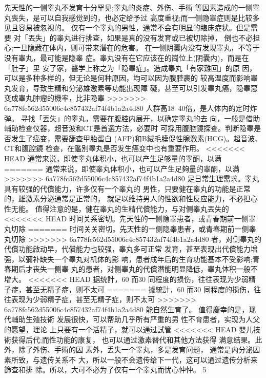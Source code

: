 \documentclass[12pt,UTF8]{ctexbook}
\begin{document}
先天性的一侧睾丸不发育十分罕见;睾丸的炎症、外伤、手術
等因素造成的一侧睾丸喪失，是可以自我感觉到的，也必定给予过
高度重视;而一侧隐睾症则是比较多见且容易被忽视的。
仅有一个睾丸的男性，通常不会有明显的臨床症状。但是需要
对「丟失」的睾丸进行排查，如果是真的没有发育或已被切除掉，
倒也不必担心;一旦隐藏在体内，则可带来潛在的危害。
在一侧阴囊内没有发现睾丸，不等于没有睾丸，最可能是隐睾
症。睾丸没有在它应该在的崗位上(阴囊内)，而是在「肚子」里
安了家，醫学上称之为「隐睾症」。造成睾丸「有家難回」的原
因，可以是多种多样的，但无论是何种原因，均可以因为腹腔裹的
较高温度而影响睾丸发育，导致生精和分泌雄激素等功能出现障
礙，甚至可以引发睾丸癌，隐睾惡变成睾丸肿瘤的機率，比非隐睾
>>>>>>> 6a778fc562d55006c4c857432af74f4b1a2a4d80
人群高18~40倍，是人体内的定时炸弹。
寻找「丟失」的睾丸，需要在腹腔内展开，以确定睾丸的去
向，一般是借助輔助检查仪器，超音波和CT是首選方法，必要时
可採用腹腔鏡探查。判断隐睾是否发生了癌变，需要篩查甲胎蛋白
(AFP)和B絨毛膜促性腺激素(HCG)。超音波、CT和腹腔鏡
检查，在鑑別睾丸是否发生癌变中也有重要作用。
<<<<<<< HEAD
通常来说，即使睾丸体积小，也可以产生足够量的睾酮，以满
=======
通常来说，即使睾丸体积小，也可以产生足夠量的睾酮，以满
>>>>>>> 6a778fc562d55006c4c857432af74f4b1a2a4d80
足日常生理需求。睾丸具有较强的代償能力，许多仅有一个睾丸的
男性，只要健在睾丸的功能是正常的，雄激素分泌通常是正常的，
就足以维持男人的性欲和性反应能力，不必担心性无能。
值得注意的是，健在睾丸的生精代償能力，与对侧睾丸丟失的
<<<<<<< HEAD
时间关系密切。先天性的一侧隐睾患者，或青春期前一侧睾丸切除
=======
时间关关密切。先天性的一侧隐睾患者，或青春期前一侧睾丸切除
>>>>>>> 6a778fc562d55006c4c857432af74f4b1a2a4d80
者，对侧睾丸的代償功能啟动早，代償能力也较强，睾丸多可正常
发育，甚至表现出代償能力增强，以彌补缺失一个睾丸对机体的影
响，患者成年后的生育功能基本不受影响;青春期后才丧失一侧睾
丸的患者，对侧睾丸的代償潛能明显降低，睾丸体积一般不增大。
<<<<<<< HEAD
据统計，60%
而30%
同程度的损伤，往往表现为少弱精子症，甚至无精子症，则不太可
=======
據統計，60%
而30%
同程度的损伤，往往表现为少弱精子症，甚至无精子症，则不太可
>>>>>>> 6a778fc562d55006c4c857432af74f4b1a2a4d80
能自然生育了。
值得慶幸的是，现代輔助生殖技術
发展很快，可以帮助几乎所有严重的男
性不育患者，实现为人父的愿望，理论
上只要有一个活精子，就可以通过試管
<<<<<<< HEAD
嬰儿技術获得后代;而性功能的康复，
也可以通过激素替代和其他方法获得
满意结果。此外，除了外伤、手術的因
素外，丢失一个睾丸，多是发育问题，
通常是内分泌因素所致，与遗传关系不
大，所以一般不会遗传给下一代，这可以通过遗传分析来篩查和排
除。所以，大可不必为了仅有一个睾丸而忧心忡忡。
5
\end{document}

